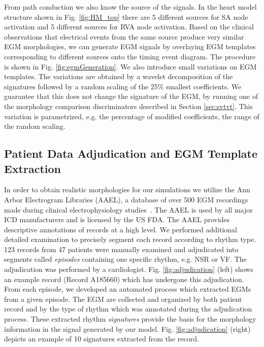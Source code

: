 From path conduction we also know the source of the signals.
In the heart model structure shown in Fig. \ref{fig:HM_top} there are 5 different sources for SA node activation and 5 different sources for RVA node activation. 
Based on the clinical observations that electrical events from the same source produce very similar EGM morphologies, we can generate EGM signals by overlaying EGM templates corresponding to different sources onto the timing event diagram.
The procedure is shown in Fig. \ref{fig:egmGeneration}.
We also introduce small variations on EGM templates.
The variations are obtained by a wavelet decomposition of the signatures followed by a random scaling of the 25\% smallest coefficients.
We guarantee that this does not change the signature of the EGM, by running one of the morphology comparison discriminators described in Section \ref{sec:svtvt}.
This variation is parametrized, e.g. the percentage of modified coefficients, the range of the random scaling.

\subsection{Patient Data Adjudication and EGM Template Extraction}
In order to obtain realistic morphologies for our simulations we utilize the Ann Arbor Electrogram Libraries (AAEL), a database of over 500 EGM recordings made during clinical electrophysiology studies~\cite{AAEL}. 
The AAEL is used by all major ICD manufacturers and is licensed by the US FDA. 
The AAEL provides descriptive annotations of records at a high level.
We performed additional detailed examination to precisely segment each record according to rhythm type.
123 records from 47 patients were manually examined and adjudicated into segments called \emph{episodes} containing one specific rhythm, e.g. NSR or VF. 
The adjudication was performed by a cardiologist.
Fig. \ref{fig:adjudication} (left) shows an example record (Record A185660) which has undergone this adjudication.
From each episode, we developed an automated process which extracted EGMs from a given episode. 
The EGM are collected and organized by both patient record and by the type of rhythm which was annotated during the adjudication process.
These extracted rhythm \emph{signatures} provide the basis for the morphology information in the signal generated by our model.
Fig. \ref{fig:adjudication} (right) depicts an example of 10 signatures extracted from the record. 

